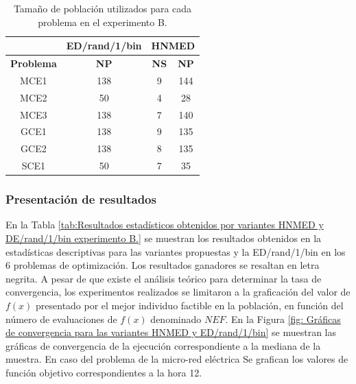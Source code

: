 \begin{table}[]
	\centering
	\caption{Tamaño de población utilizados para cada problema en el experimento B.}
	\label{tab:Tamaño de población utilizados para cada problema en el experimento B.}
	\begin{tabular}{cccc}
		& \textbf{ED/rand/1/bin }& \multicolumn{2}{l}{\textbf{HNMED}} \\
		\hline
		\textbf{Problema} & \textbf{NP}            & \textbf{NS}          & \textbf{NP}          \\
		\hline
		MCE1     & 138           & 9           & 144         \\
		MCE2     & 50            & 4           & 28          \\
		MCE3     & 138           & 7           & 140         \\
		GCE1     & 138           & 9           & 135         \\
		GCE2     & 138           & 8           & 135         \\
		SCE1     & 50            & 7           & 35         
	\end{tabular}
\end{table}

\subsubsection{Presentación de resultados}
En la Tabla \ref{tab:Resultados estadísticos obtenidos por variantes HNMED y DE/rand/1/bin  experimento B.} se muestran los resultados obtenidos en la estadísticas descriptivas para las variantes propuestas y la ED/rand/1/bin en los 6 problemas de optimización. Los resultados ganadores se resaltan en letra negrita. A pesar de que existe el análisis teórico para determinar la tasa de convergencia, los experimentos realizados se limitaron a la graficación del valor de $f(x)$ presentado por el mejor individuo factible en la población, en función del número de evaluaciones de $f(x)$ denominado $NEF$. En la Figura \ref{fig: Gráficas de convergencia para las variantes HNMED y ED/rand/1/bin} se muestran las gráficas de convergencia de la ejecución correspondiente a la mediana de la muestra. En caso del problema de la micro-red eléctrica Se grafican los valores de función objetivo correspondientes a la hora 12.   

